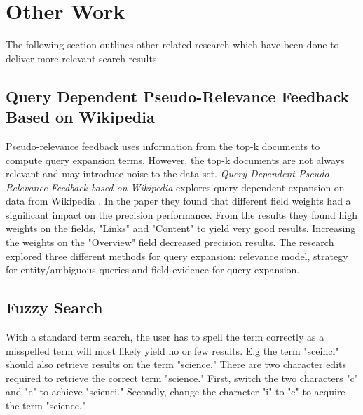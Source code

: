 

\section{Other Work}
The following section outlines other related research which have been done to deliver more relevant search results.

\subsection{Query Dependent Pseudo-Relevance Feedback Based on Wikipedia}
Pseudo-relevance feedback uses information from the top-k documents to compute query expansion terms.
However, the top-k documents are not always relevant and may introduce noise to the data set.
\textit{Query Dependent Pseudo-Relevance Feedback based on Wikipedia} explores query dependent expansion on data from Wikipedia \cite{pseudo-relevance-wikipedia}.
In the paper they found that different field weights had a significant impact on the precision performance.
From the results they found high weights on the fields, "Links" and "Content" to yield very good results.
Increasing the weights on the "Overview" field decreased precision results.
The research explored three different methods for query expansion:
relevance model, strategy for entity/ambiguous queries and field evidence for query expansion.

\subsection{Fuzzy Search}
With a standard term search, the user has to spell the term correctly as a misspelled term will most likely yield no or few results.
E.g the term "sceinci" should also retrieve results on the term "science."
There are two character edits required to retrieve the correct term "science."
First, switch the two characters "c" and "e" to achieve "scienci."
Secondly, change the character "i" to "e" to acquire the term "science."

